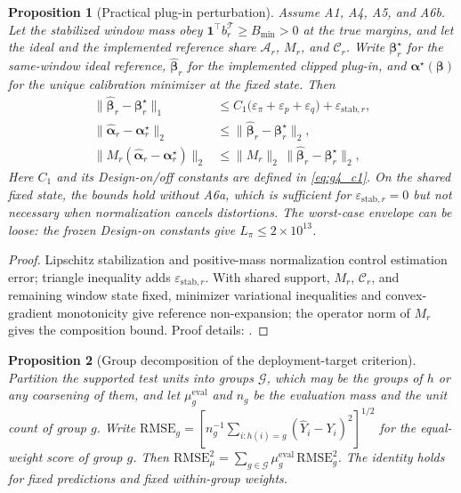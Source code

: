 \documentclass[letterpaper,journal]{IEEEtran}
\newtheorem{proposition}{Proposition}
\begin{document}
\begin{proposition}[Practical plug-in perturbation]
\label{prop:practical_plugin}
Assume A1, A4, A5, and A6b.  Let the stabilized window mass obey
$\mathbf{1}^{\top}b_r^{\mathcal T}\ge B_{\min}>0$ at the true margins, and let
the ideal and the implemented reference share $\mathcal{A}_r$, $M_r$, and
$\mathcal{C}_r$.  Write $\boldsymbol\beta_r^\star$ for the same-window ideal reference,
$\widehat{\boldsymbol\beta}_r$ for the implemented clipped plug-in, and
$\boldsymbol\alpha^\star(\boldsymbol\beta)$ for the unique calibration minimizer
at the fixed state.  Then
\begin{align}
\bigl\|\widehat{\boldsymbol\beta}_r-\boldsymbol\beta_r^\star\bigr\|_1
&\le
C_1\bigl(\varepsilon_\pi+\varepsilon_p+\varepsilon_q\bigr)
+\varepsilon_{\mathrm{stab},r},
\label{eq:g4_beta}\\
\bigl\|\widehat{\boldsymbol\alpha}_r-\boldsymbol\alpha_r^\star\bigr\|_2
&\le
\bigl\|\widehat{\boldsymbol\beta}_r-\boldsymbol\beta_r^\star\bigr\|_2,
\label{eq:g4_alpha}\\
\bigl\|M_r(\widehat{\boldsymbol\alpha}_r-\boldsymbol\alpha_r^\star)\bigr\|_2
&\le
\|M_r\|_2\,
\bigl\|\widehat{\boldsymbol\beta}_r-\boldsymbol\beta_r^\star\bigr\|_2,
\label{eq:g4_comp}
\end{align}
Here $C_1$ and its Design-on/off constants are defined in
\eqref{eq:g4_c1}.  On the shared fixed state, the bounds hold without A6a, which is sufficient
for $\varepsilon_{\mathrm{stab},r}=0$ but not necessary when normalization
cancels distortions. The worst-case envelope can be loose:
the frozen Design-on constants give $L_\pi\le2\times10^{13}$.
\end{proposition}

\begin{proof}
Lipschitz stabilization and positive-mass normalization control estimation
error; triangle inequality adds $\varepsilon_{\mathrm{stab},r}$.
With shared support, $M_r$, $\mathcal C_r$, and remaining window state fixed,
minimizer variational inequalities and convex-gradient monotonicity give reference non-expansion;
the operator norm of $M_r$ gives the composition bound.
Proof details: .
\end{proof}

\begin{proposition}[Group decomposition of the deployment-target criterion]
\label{prop:group_decomposition}
Partition the supported test units into groups $\mathcal G$, which may be the
groups of $h$ or any coarsening of them, and let $\mu^{\mathrm{eval}}_g$ and
$n_g$ be the evaluation mass and the unit count of group $g$.  Write
$\mathrm{RMSE}_g=[n_g^{-1}\sum_{i:h(i)=g}(\widehat Y_i-Y_i)^2]^{1/2}$ for the
equal-weight score of group $g$.  Then
$\mathrm{RMSE}_{\mu}^2=\sum_{g\in\mathcal G}\mu^{\mathrm{eval}}_g\,\mathrm{RMSE}_g^2$.
The identity holds for fixed predictions and fixed within-group weights.
\end{proposition}
\end{document}
